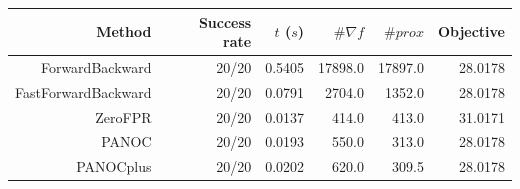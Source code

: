 \begin{tabular}{rrrrrr}
  \toprule
  \textbf{Method} & \textbf{Success rate} & \textbf{$t$ ($s$)} & \textbf{$\#\nabla f$} & \textbf{$\#prox$} & \textbf{Objective} \\
  \midrule
  ForwardBackward & 20/20 & 0.5405 & 17898.0 & 17897.0 & 28.0178 \\
  FastForwardBackward & 20/20 & 0.0791 & 2704.0 & 1352.0 & 28.0178 \\
  ZeroFPR & 20/20 & 0.0137 & 414.0 & 413.0 & 31.0171 \\
  PANOC & 20/20 & 0.0193 & 550.0 & 313.0 & 28.0178 \\
  PANOCplus & 20/20 & 0.0202 & 620.0 & 309.5 & 28.0178 \\
  \bottomrule
\end{tabular}
